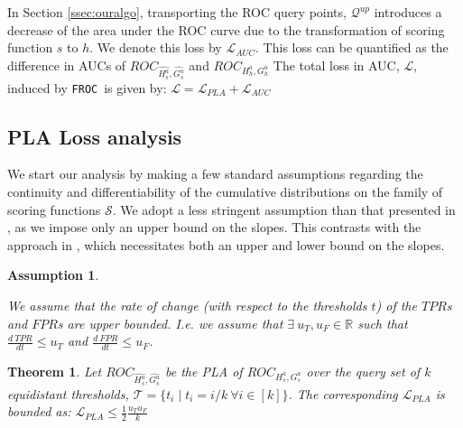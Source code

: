 \documentclass{article}
\newtheorem{theorem}{Theorem}[section]
\newtheorem{assumption}{Assumption}[section]
\newcommand{\ouralgo}{\texttt{FROC}}
\begin{document}
In Section \ref{ssec:ouralgo}, transporting the ROC query points, $\mathcal{Q}^{up}$ introduces a decrease of the area under the ROC curve due to the transformation of scoring function $s$ to $h$. We denote this loss by $\mathcal{L}_{AUC}$. 
This loss can be quantified as the difference in AUCs of $ROC_{\widehat{H_s^a}, \widehat{G_s^a}}$ and $ROC_{H_h^a, G_h^a}$
The total loss in AUC, $\mathcal{L}$, induced by \ouralgo\ is given by:
$\mathcal{L} = \mathcal{L}_{PLA} + \mathcal{L}_{AUC}$

\subsection{PLA Loss analysis} \label{ssec:lossplabound}

We start our analysis by making a few standard assumptions regarding the continuity and differentiability of the cumulative distributions on the family of scoring functions $\mathcal{S}$.
We adopt a less stringent assumption than that presented in \cite{vogel2021}, as we impose only an upper bound on the slopes. This contrasts with the approach in \cite{vogel2021}, which necessitates both an upper and lower bound on the slopes.
\begin{assumption} \label{assumption1}

We assume that the rate of change (with respect to the thresholds $t$) of the $TPR$s and $FPR$s are upper bounded. I.e. we assume that $\exists~ u_T , u_F \in \mathbb{R}$ such that $\frac{d~TPR}{dt}\le u_T$ and $\frac{d~FPR}{dt}\le u_F$. 
\end{assumption}



\begin{theorem} \label{th:pla}
Let $ROC_{\widehat{H_s^a}, \widehat{G_s^a}}$ be the \emph{PLA} of $ROC_{H_s^a,G_s^a}$ over the query set of $k$ equidistant thresholds, $\mathcal{T} = \{ t_i \mid t_i = i/k \ \forall i \in [k] \}$. The corresponding $\mathcal{L}_{PLA}$ is bounded as:
    $\mathcal{L}_{PLA} \le\frac{1}{2} \frac{u_Tu_F}{k}$
\end{theorem}
\end{document}
